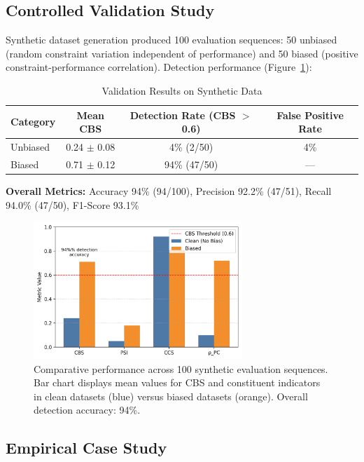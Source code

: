 \documentclass[10pt]{article}
\begin{document}
\subsection{Controlled Validation Study}

Synthetic dataset generation produced 100 evaluation sequences: 50 unbiased (random constraint variation independent of performance) and 50 biased (positive constraint-performance correlation). Detection performance (Figure~\ref{fig:validation}):

\begin{table}[h]
\centering
\caption{Validation Results on Synthetic Data}
\begin{tabular}{lccc}
\toprule
Category & Mean CBS & Detection Rate (CBS $>$ 0.6) & False Positive Rate \\
\midrule
Unbiased & 0.24 $\pm$ 0.08 & 4\% (2/50) & 4\% \\
Biased & 0.71 $\pm$ 0.12 & 94\% (47/50) & --- \\
\bottomrule
\end{tabular}
\end{table}

\textbf{Overall Metrics:} Accuracy 94\% (94/100), Precision 92.2\% (47/51), Recall 94.0\% (47/50), F1-Score 93.1\%

\begin{figure}[ht]
\centering
\includegraphics[width=0.7\textwidth]{fig2_validation.png}
\caption{Comparative performance across 100 synthetic evaluation sequences. Bar chart displays mean values for CBS and constituent indicators in clean datasets (blue) versus biased datasets (orange). Overall detection accuracy: 94\%.}
\label{fig:validation}
\end{figure}

\subsection{Empirical Case Study}
\end{document}
